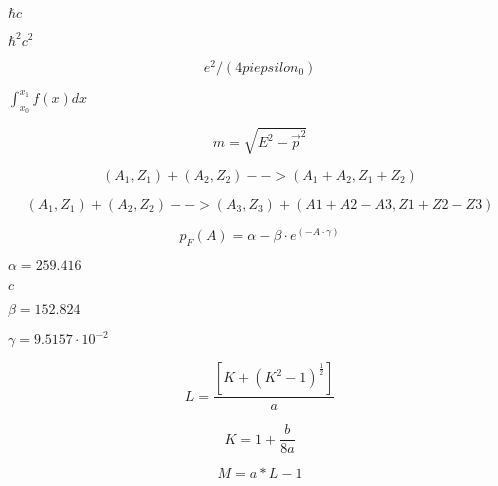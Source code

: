 \documentclass{article}
\begin{document}
$\hbar c$
\pagebreak

$\hbar^2 c^2$
\pagebreak

\[ e^2/(4 pi epsilon_0) \]
\pagebreak

$\int_{x_0}^{x_1} f(x) dx$
\pagebreak

\[ m = \sqrt{E^2 - {\vec p}^2}\]
\pagebreak

\[ (A_1,Z_1) + (A_2, Z_2) --> (A_1+A_2,Z_1+Z_2) \]
\pagebreak

\[ (A_1,Z_1) + (A_2, Z_2) --> (A_3,Z_3) + (A1+A2-A3,Z1+Z2-Z3) \]
\pagebreak

\[ p_F(A)=\alpha-\beta\cdot e^{(-A\cdot\gamma)} \]
\pagebreak

$\alpha=259.416$
\pagebreak

$c$
\pagebreak

$\beta=152.824$
\pagebreak

$\gamma=9.5157\cdot10^{-2}$
\pagebreak

\[ L = \frac{[K + (K^2 - 1)^\frac{1}{2}]}{a} \]
\pagebreak

\[ K = 1 + \frac{b}{8a} \]
\pagebreak

\[ M = a*L-1 \]
\pagebreak
\end{document}
